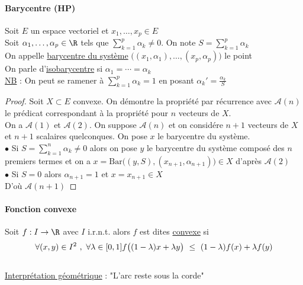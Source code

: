 {    \paragraph{Barycentre (HP)}
        Soit $E$ un espace vectoriel et $x_1,\dots ,x_p \in E$ \\
        Soit $\alpha_1 ,\dots ,\alpha_p\in \R$ tels que $\sum_{k=1}^p \alpha_k \neq 0$. On note $S = \sum_{k=1}^p \alpha_k$\\
        On appelle \underline{barycentre du système} $\big( (x_1,\alpha_1) ,\dots ,(x_p,\alpha_p) \big)$ le point 
        \\
        On parle d'\underline{isobarycentre} si $\alpha_1 = \cdots = \alpha_k$ \trait \vspace*{-1.1cm}
        \\ {\small \underline{NB} : On peut se ramener à $\sum_{k=1}^p \alpha_k=1$ en posant $\alpha_k'=\frac{\alpha_k}{S}$}
    \vspace*{0.5cm} \\ 
    \begin{proof}
    Soit $X\subset E$ convexe. On démontre la propriété par récurrence avec $\mathcal{A}(n)$ le prédicat correspondant à la propriété 
    pour $n$ vecteurs de $X$. \\
    On a $\mathcal{A}(1)$ et $\mathcal{A}(2)$. On suppose $\mathcal{A}(n)$ et on considére $n+1$ vecteurs de $X$ et $n+1$ scalaires 
    quelconques. On pose $x$ le barycentre du système. \\
    $\bullet $ Si $S = \sum_{k=1}^n \alpha_k \neq 0$ alors on pose $y$ le barycentre du système composé des $n$ premiers termes et on a 
    $x= \mathrm{Bar} \big( (y,S),(x_{n+1},\alpha_{n+1}) \big) \in X$ d'après $\mathcal{A}(2)$ \\
    $\bullet $ Si $S=0$ alors $\alpha_{n+1} = 1$ et $x=x_{n+1} \in X$ \\
    D'où $\mathcal{A}(n+1)$
    \end{proof} \traitd
    \paragraph{Fonction convexe}
        Soit $f:I\rightarrow \R$ avec $I$ i.r.n.t. alors $f$ est dites \underline{convexe} si 
        \[\forall (x,y) \in I^2 ~,~\forall \lambda\in [0,1] \\ f\big( (1-\lambda )x + \lambda y \big) ~\leq ~
        (1-\lambda )f(x) + \lambda f(y)\] \trait \vspace*{-1.2cm} \\
    {\small \underline{Interprétation géométrique} : "L'arc reste sous la corde"} \traitd
}
